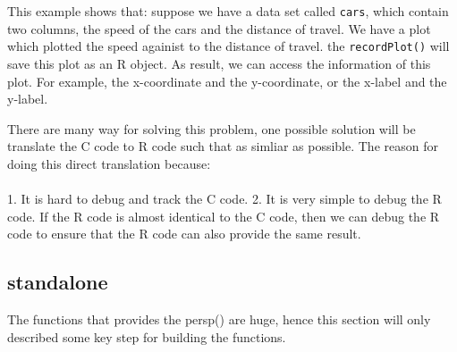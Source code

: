 \documentclass[a4paper,10pt]{article}\usepackage[]{graphicx}\usepackage[]{color}
\begin{document}
This example shows that: suppose we have a data set called \texttt{cars}, which contain two columns, the speed of the cars and the distance of travel. We have a plot which plotted the speed againist to the distance of travel. the \texttt{recordPlot()} will save this plot as an R object. As result, we can access the information of this plot. For example, the x-coordinate and the y-coordinate, or the x-label and the y-label.


There are many way for solving this problem, one possible solution will be translate the C code to R code such that as simliar as possible. The reason for doing this direct translation because: \\\\
1. It is hard to debug and track the C code.
2. It is very simple to debug the R code. If the R code is almost identical to the C code, then we can debug the R code to ensure that the R code can also provide the same result.

\subsection{standalone}
The functions that provides the persp() are huge, hence this section will only described some key step for building the functions.

\
\end{document}
